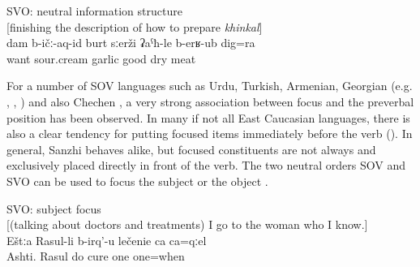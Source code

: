 \begin{exe}
	\ex	SVO: neutral information structure\\	\label{ex:‎‎‎I like garlic, fried tomato sauce, and also well dried-meat SVO}
		[finishing the description of how to prepare \textit{khinkal}]\\
	\gll	dam	b-ičː-aq-id	burt	sːerži	ʡaˁħ-le	b-erʁ-ub	dig=ra\\
		 want sour.cream	garlic	good dry	meat\\
	\glt	{}
\end{exe}

For a number of SOV languages such as Urdu, Turkish, Armenian, Georgian (e.g. \citealt{ButtKing1996}, \citealt{Comrie1984},  \citealt{Testelec1998b}) and also Chechen \citep{Komen2007}, a very strong association between focus and the preverbal position has been observed. In many if not all East Caucasian languages, there is also a clear tendency for putting focused items immediately before the verb  (\citealt{Testelec1998a, Testelets.1998c, Forker.Belyaev2016}). In general, Sanzhi behaves alike, but focused constituents are not always and exclusively placed directly in front of the verb. The two neutral orders SOV and SVO can be used to focus the subject  or the object .

%
\begin{exe}
	\ex	SVO: subject focus\\\label{ex:‎‎In Ashti Rasul makes cures SVO}%
		[(talking about doctors and treatments) I go to the woman who I know.]\\
	\gll	Eštːa	Rasul-li	b-irq'-u	lečenie	ca	ca=qːel\\
		Ashti.	Rasul	do	cure	one	one=when\\
	\glt	{}
\end{exe}

